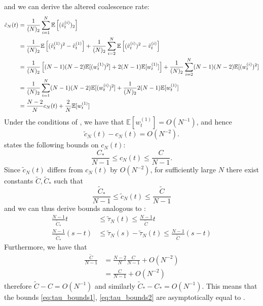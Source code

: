\documentclass{article}
\newcommand{\E}{\mathbb{E}}
\newcommand{\vttilde}[2][t]{\tilde{v}_{#1}^{(#2)}}
\newcommand{\wt}[2][t]{w_{#1}^{(#2)}}
\begin{document}
and we can derive the altered coalescence rate:
\begin{align}
\tilde{c}_N(t) &= \frac{1}{(N)_2} \sum_{i=1}^{N} \E\left[ (\vttilde{i})_2 \right] \notag\\
&= \frac{1}{(N)_2} \E\left[ (\vttilde{1})^2 - \vttilde{1} \right] + \frac{1}{(N)_2}\sum_{i=2}^{N} \E\left[ (\vttilde{i})^2 - \vttilde{i} \right] \notag\\
&= \frac{1}{(N)_2}\left[ (N-1)(N-2)\E[(\wt{1})^2] + 2(N-1)\E[\wt{1}] \right] + \frac{1}{(N)_2} \sum_{i=2}^{N} (N-1)(N-2)\E[(\wt{i})^2] \notag\\
&= \frac{1}{(N)_2} \sum_{i=1}^{N} (N-1)(N-2)\E[(\wt{i})^2] + \frac{1}{(N)_2} 2(N-1)\E[\wt{1}] \notag\\
&= \frac{N-2}{N} c_N(t) + \frac{2}{N} \E[\wt{1}]
\end{align}
Under the conditions of \citet[Corollary 2]{koskela2018}, we have that $\E[\wt{1}] = O(N^{-1})$, and hence
\begin{equation*}
\tilde{c}_N(t) - c_N(t) = O(N^{-2}).
\end{equation*}
\citet{koskela2018} states the following bounds on $c_N(t)$:
\begin{equation*}
\frac{C_*}{N-1} \leq c_N(t) \leq \frac{C}{N-1}.
\end{equation*}
Since $\tilde{c}_N(t)$ differs from $c_N(t)$ by $O(N^{-2})$, for sufficiently large $N$ there exist constants $\tilde{C}, \tilde{C}_*$ such that
\begin{equation*}
\frac{\tilde{C}_*}{N-1} \leq \tilde{c}_N(t) \leq \frac{\tilde{C}}{N-1}
\end{equation*}
and we can thus derive bounds analogous to \citet[(5)-(6)]{koskela2018}:
\begin{align}
\frac{N-1}{\tilde{C}_*}t &\leq \tilde{\tau}_N(t) \leq \frac{N-1}{\tilde{C}}t \label{eq:tau_bounds1}\\
\frac{N-1}{\tilde{C}_*}(s-t) &\leq \tilde{\tau}_N(s) - \tilde{\tau}_N(t) \leq \frac{N-1}{\tilde{C}}(s-t) \label{eq:tau_bounds2}
\end{align}
Furthermore, we have that
\begin{align*}
\frac{\tilde{C}}{N-1} &= \frac{N-2}{N} \frac{C}{N-1} + O(N^{-2}) \\
&= \frac{C}{N-1} + O(N^{-2})
\end{align*}
therefore $\tilde{C} - C = O(N^{-1})$ and similarly $\tilde{C}_* - C_* = O(N^{-1})$. 
This means that the bounds \eqref{eq:tau_bounds1}, \eqref{eq:tau_bounds2} are asymptotically equal to \citet[(5)--(6)]{koskela2018}.
\end{document}
